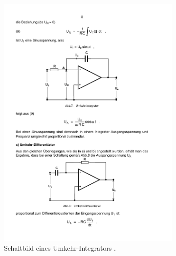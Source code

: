 \begin{figure}
    \begin{subfigure}{.49\linewidth}
        \centering
        \includegraphics[width=1.0\linewidth]{img/integrator.pdf}
        \caption{Schaltbild eines Umkehr-Integrators \cite{V51}.}
        \label{fig:integrator-integrator}
    \end{subfigure}
    \begin{subfigure}{.49\linewidth}
        \centering

\end{subfigure}
\end{figure}

